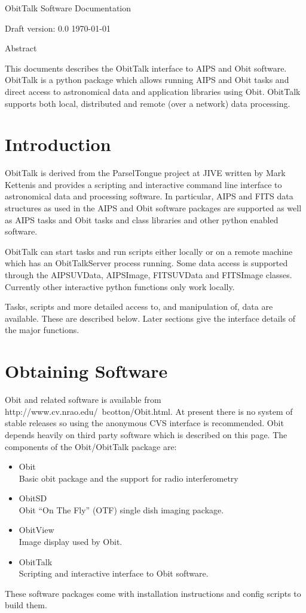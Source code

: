 \documentclass[11pt]{report}
\begin{document}
\setcounter{chapter}{1}

\topskip 1.5in
\centerline{\ttlfont ObitTalk Software Documentation }
\vskip 3cm
\centerline{\secfont Draft version: 0.0 \today}
\vskip 1cm

\centerline{\secfont Abstract}
This documents describes the ObitTalk interface to AIPS and Obit
software.
ObitTalk is a python package which allows running AIPS and Obit tasks
and direct access to astronomical data and application libraries using
Obit. 
ObitTalk supports both local, distributed and remote (over a network)
data processing. 
\clearpage
\topskip 0in
\newpage 
\tableofcontents
\newpage

\section {Introduction}
   ObitTalk is derived from the ParselTongue project at JIVE written
by Mark Kettenis and provides a scripting and interactive command line
interface to astronomical data and processing software.  
In particular, AIPS and FITS data structures as used in the AIPS and
Obit software packages  are supported as well as AIPS tasks and Obit
tasks and class libraries and other python enabled software.

   ObitTalk can start tasks and run scripts either locally or on a
remote machine which has an ObitTalkServer process running.  
Some data access is supported through the AIPSUVData, AIPSImage,
FITSUVData and FITSImage classes.  
Currently other interactive python functions only work locally.

   Tasks, scripts and more detailed access to, and manipulation of, data
are available.  
These are described below.
Later sections give the interface details of the major functions.

\section {Obtaining Software}
Obit and related software is available from
http://www.cv.nrao.edu/~bcotton/Obit.html. 
At present there is no system of stable releases so using the
anonymous CVS interface is recommended.
Obit depends heavily on third party software which is described on
this page.
The components of the Obit/ObitTalk package are:
\begin{itemize}
\item Obit\\
Basic obit package and the support for radio interferometry
\item ObitSD\\
Obit ``On The Fly'' (OTF) single dish imaging package.
\item ObitView\\
Image display used by Obit.
\item ObitTalk\\
Scripting and interactive interface to Obit software.
\end{itemize}
These software packages come with installation instructions and config
scripts to build them.
\end{document}
